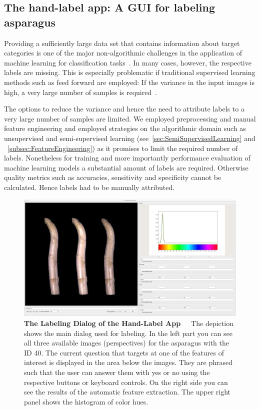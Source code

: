 \subsection{The hand-label app: A GUI for labeling asparagus}
\label{sec:LabelApp}

Providing a sufficiently large data set that contains information about target categories is one of the major non-algorithmic challenges in the application of machine learning for classification tasks~\citep{al2018labeling}. In many cases, however, the respective labels are missing. This is especially problematic if traditional supervised learning methods such as feed forward  are employed: If the variance in the input images is high, a very large number of samples is required~\citep{russakovsky2015imagenet}. 

\bigskip
The options to reduce the variance and hence the need to attribute labels to a very large number of samples are limited. We employed preprocessing and manual feature engineering and employed strategies on the algorithmic domain such as unsupervised and semi-supervised learning (see~\autoref{sec:SemiSupervisedLearning} and ~\autoref{subsec:FeatureEngineering}) as it promises to limit the required number of labels. Nonetheless for training and more importantly performance evaluation of machine learning models a substantial amount of labels are required. Otherwise quality metrics such as accuracies, sensitivity and specificity cannot be calculated. Hence labels had to be manually attributed.

\begin{figure}[!htb]
	\centering
	\includegraphics[scale=0.3]{Figures/chapter03/labelapp_example.png}
	\decoRule
	\caption[The Labeling Dialog of the Hand-Label App]{\textbf{The Labeling Dialog of the Hand-Label App}~~~The depiction shows the main dialog used for labeling. In the left part you can see all three available images (perspectives) for the asparagus with the ID 40. The current question that targets at one of the features of interest is displayed in the area below the images. They are phrased such that the user can answer them with yes or no using the respective buttons or keyboard controls. On the right side you can see the results of the automatic feature extraction. The upper right panel shows the histogram of color hues.}
	\label{fig:LabelAppGUI}
\end{figure}

